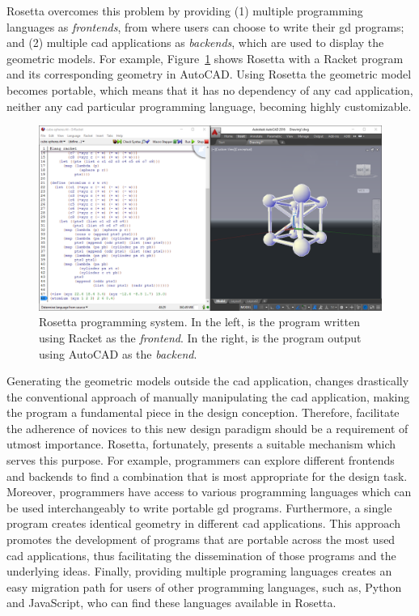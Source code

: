 Rosetta overcomes this problem by providing (1) multiple programming languages as \textit{frontends}, from where users can choose to write their \gls{gd} programs; and (2) multiple \gls{cad} applications as \textit{backends}, which are used to
display the geometric models. For example, Figure~\ref{fig:rosetta-gui} shows Rosetta with a Racket program and its corresponding geometry in AutoCAD. Using Rosetta the geometric model becomes portable, which means that it has no dependency of any \gls{cad} application, neither any \gls{cad} particular programming language, becoming highly customizable.

\begin{figure}[!h]
  \centering
  \includegraphics[width=.85\textwidth]{images/rosetta-gui}
    \caption{Rosetta programming system. In the left, is the program written using Racket as the \textit{frontend}. In the right, is the program output using AutoCAD as the \textit{backend}.}
  \label{fig:rosetta-gui}
\end{figure}

Generating the geometric models outside the \gls{cad} application, changes drastically the conventional approach of manually manipulating the \gls{cad} application, making the program a fundamental piece in the design conception. Therefore, facilitate the adherence of novices to this new design paradigm should be a requirement of utmost importance. Rosetta, fortunately, presents a suitable mechanism which serves this purpose. For example, programmers can explore different frontends and backends to find a combination that is most appropriate for the design task. Moreover, programmers have access to various programming languages which can be used interchangeably to write portable \gls{gd} programs. Furthermore, a single program creates identical geometry in different \gls{cad} applications. This approach promotes the development of programs that are portable across the most used \gls{cad} applications, thus facilitating the dissemination of those programs and the underlying ideas. Finally, providing multiple programing languages creates an easy migration path for users of other programming languages, such as, Python and JavaScript, who can find these languages available in Rosetta.

